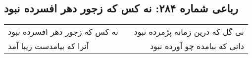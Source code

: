 \begin{center}
\section*{رباعی شماره ۲۸۴: نه کس که زجور دهر افسرده نبود}
\label{sec:sh284}
\begin{longtable}{l p{0.5cm} r}
نه کس که زجور دهر افسرده نبود
&&
نی گل که درین زمانه پژمرده نبود
\\
آنرا که بیامدست زیبا آمد
&&
دانی که بیامده چو آورده نبود
\\
\end{longtable}
\end{center}
